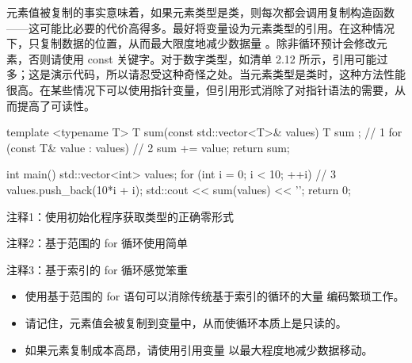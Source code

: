 元素值被复制的事实意味着，如果元素类型是类，则每次都会调用复制构造函数——这可能比必要的代价高得多。最好将变量设为元素类型的引用。在这种情况下，只复制数据的位置，从而最大限度地减少数据量 。除非循环预计会修改元素，否则请使用 const 关键字。对于数字类型，如清单 2.12 所示，引用可能过多；这是演示代码，所以请忍受这种奇怪之处。当元素类型是类时，这种方法性能很高。在某些情况下可以使用指针变量，但引用形式消除了对指针语法的需要，从而提高了可读性。


\begin{cpp}
template <typename T>
T sum(const std::vector<T>& values) {
  T sum {}; // 1
  for (const T& value : values) // 2
    sum += value;
  return sum;
}

int main() {
  std::vector<int> values;
  for (int i = 0; i < 10; ++i) // 3
    values.push_back(10*i + i);
  std::cout << sum(values) << '\n';
  return 0;
}
\end{cpp}

{\footnotesize
注释1：使用初始化程序获取类型的正确零形式

注释2：基于范围的 for 循环使用简单

注释3：基于索引的 for 循环感觉笨重
}


\begin{itemize}
\item
使用基于范围的 for 语句可以消除传统基于索引的循环的大量 编码繁琐工作。

\item
请记住，元素值会被复制到变量中，从而使循环本质上是只读的。

\item
如果元素复制成本高昂，请使用引用变量 以最大程度地减少数据移动。
\end{itemize}



















